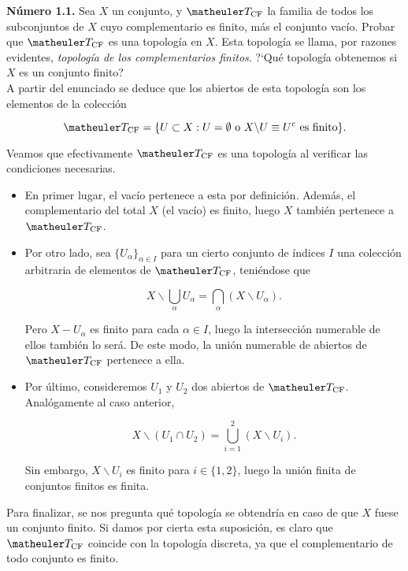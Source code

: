 
\textbf{Número 1.1.} Sea $X$ un conjunto, y $\T_{\text{CF}}$ la familia de todos los subconjuntos de $X$ cuyo complementario es finito, más el conjunto vacío. Probar que $\T_{\text{CF}}$ es una topología en $X$. Esta topología se llama, por razones evidentes, \textit{topología de los complementarios finitos}. ?`Qué topología obtenemos si $X$ es un conjunto finito?  \\

A partir del enunciado se deduce que los abiertos de esta topología son los elementos de la colección 

\[\T_{\text{CF}}= \{U \subset X : U= \emptyset \text{ o } X \backslash U\equiv U^c \text{ es finito}\}.\]

Veamos que efectivamente $\T_{\text{CF}}$ es una topología al verificar las condiciones necesarias. 

\begin{itemize}
\item En primer lugar, el vacío pertenece a esta por definición. Además, el complementario del total $X$ (el vacío) es finito, luego $X$ también pertenece a $\T_{\text{CF}}$. 

\item Por otro lado, sea $\{U_\alpha\}_{\alpha \in I}$ para un cierto conjunto de índices $I$ una colección arbitraria de elementos de $\T_{\text{CF}}$, teniéndose que 

\[X \backslash \bigcup_{\alpha}U_\alpha = \bigcap_{\alpha} (X\backslash U_\alpha).\]

Pero $X-U_\alpha$ es finito para cada $\alpha \in I$, luego la intersección numerable de ellos también lo será. De este modo, la unión numerable de abiertos de $\T_{\text{CF}}$ pertenece a ella.

\item Por último, consideremos $U_1$ y $U_2$ dos abiertos de $\T_{\text{CF}}$. Analógamente al caso anterior, 

\[X \backslash (U_1 \cap U_2) = \bigcup_{i=1}^2 (X\backslash U_i).\]

Sin embargo, $X \backslash U_i$ es finito para $i\in\{1,2\}$, luego la unión finita de conjuntos finitos es finita.
\end{itemize}

Para finalizar, se nos pregunta qué topología se obtendría en caso de que $X$ fuese un conjunto finito. Si damos por cierta esta suposición, es claro que $\T_{\text{CF}}$ coincide con la topología discreta, ya que el complementario de todo conjunto es finito. \\

